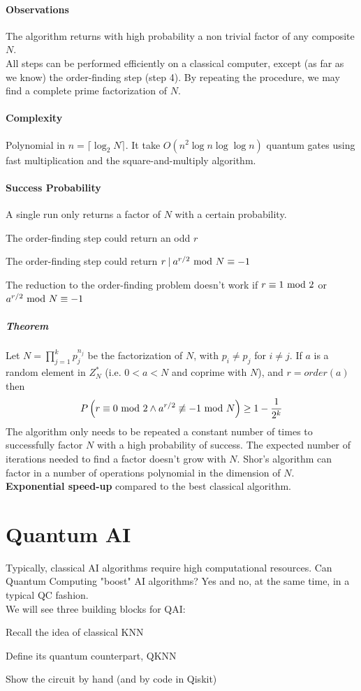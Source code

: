 \documentclass[10pt]{report}
\begin{document}
\paragraph{Observations} The algorithm returns with high probability a non trivial factor of any composite $N$.\\
All steps can be performed efficiently on a classical computer, except (as far as we know) the order-finding step (step 4). By repeating the procedure, we may find a complete prime factorization of $N$.
\paragraph{Complexity} Polynomial in $n=\lceil\log_2 N\rceil$. It take $O(n^2\log n\log\log n)$ quantum gates using fast multiplication and the square-and-multiply algorithm.
\paragraph{Success Probability} A single run only returns a factor of $N$ with a certain probability.\begin{list}{}{}
	\item The order-finding step could return an odd $r$
	\item The order-finding step could return $r\:|\:a^{r/2}\hbox{ mod }N \equiv -1$
	\item The reduction to the order-finding problem doesn't work if $r\equiv 1\hbox{ mod }2$ or $a^{r/2}\hbox{ mod }N \equiv -1$
\end{list}
\subparagraph{Theorem} Let $N = \prod_{j=1}^kp_j^{n_j}$ be the factorization of $N$, with $p_i\neq p_j$ for $i\neq j$. If $a$ is a random element in $Z_N^*$ (i.e. $0<a<N$ and coprime with $N$), and $r = order(a)$ then
$$P\left(r\equiv 0\hbox{ mod }2\wedge a^{r/2}\not\equiv -1\hbox{ mod }N\right)\geq 1-\frac{1}{2^k}$$
The algorithm only needs to be repeated a constant number of times to successfully factor $N$ with a high probability of success. The expected number of iterations needed to find a factor doesn't grow with $N$. Shor's algorithm can factor in a number of operations polynomial in the dimension of $N$.\\
\textbf{Exponential speed-up} compared to the best classical algorithm.
\section{Quantum AI} Typically, classical AI algorithms require high computational resources. Can Quantum Computing "boost" AI algorithms? Yes and no, at the same time, in a typical QC fashion.\\
We will see three building blocks for QAI:
\begin{list}{}{}
	\item Recall the idea of classical KNN
	\item Define its quantum counterpart, QKNN
	\item Show the circuit by hand (and by code in Qiskit)
\end{list}
\end{document}
